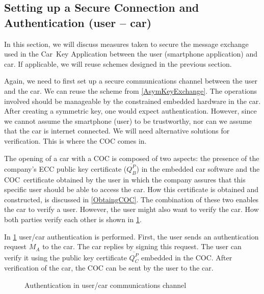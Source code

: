 \subsection{Setting up a Secure Connection and Authentication (user -- car)}

In this section, we will discuss measures taken to secure the message exchange used in the Car~Key Application between the user (smartphone application) and car. If applicable, we will reuse schemes designed in the previous section.

Again, we need to first set up a secure communications channel between the user and the car. We can reuse the scheme from \cref{AsymKeyExchange}. The operations involved should be manageable by the constrained embedded hardware in the car. After creating a symmetric key, one would expect authentication. However, since we cannot assume the smartphone (user) to be trustworthy, nor can we assume that the car is internet connected. We will need alternative solutions for verification. This is where the COC comes in.

The opening of a car with a COC is composed of two aspects: the presence of the company's ECC public key certificate ($\overline{Q_B^P}$) in the embedded car software and the COC~certificate obtained by the user in which the company assures that this specific user should be able to access the car. How this certificate is obtained and constructed, is discussed in \cref{ObtaingCOC}. The combination of these two enables the car to verify a user. However, the user might also want to verify the car. How both parties verify each other is shown in \cref{CarUserVerification}.

In \cref{CarUserVerification} user/car authentication is performed. First, the user sends an authentication request $M_A$ to the car. The car replies by signing this request. The user can verify it using the public key certificate $\overline{Q_C^P}$ embedded in the COC. After verification of the car, the COC can be sent by the user to the car.

\begin{figure}[!ht]
  \renewcommand{\Bx}{8}
  \setcounter{CC}{0}
  \centering
  \caption{Authentication in user/car communications channel}
  \label{CarUserVerification}
\end{figure}


